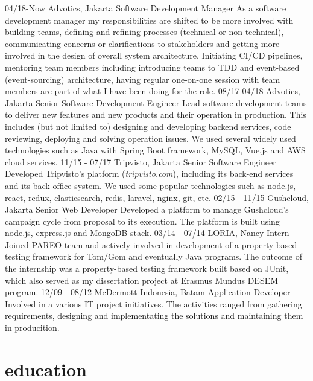 \documentclass[]{friggeri-cv}
\begin{document}
\begin{entrylist}
  \entry
    {04/18-Now}
    {Advotics, Jakarta}
    {Software Development Manager}
    {As a software development manager my responsibilities are shifted to be more involved with building teams,
	defining and refining processes (technical or non-technical), communicating concerns or clarifications to stakeholders
	and getting more involved in the design of overall system architecture. Initiating CI/CD pipelines, mentoring team members
	including introducing teams to TDD and event-based (event-sourcing) architecture,
	having regular one-on-one session with team members are part of what I have been doing for the role.}
  \entry
    {08/17-04/18}
    {Advotics, Jakarta}
    {Senior Software Development Engineer}
    {Lead software development teams to deliver new features and new products and their operation in production.
	This includes (but not limited to) designing and developing backend services, code reviewing, deploying and solving operation issues.
	We used several widely used technologies such as Java with Spring Boot framework, MySQL, Vue.js and AWS cloud services.}
  \entry
    {11/15 - 07/17}
    {Tripvisto, Jakarta}
    {Senior Software Engineer}
	{Developed Tripvisto's platform (\emph{tripvisto.com}), including its back-end services and its back-office system.
	We used some popular technologies such as node.js, react, redux, elasticsearch, redis, laravel, nginx, git, etc.}
  \entry
	{02/15 - 11/15}
	{Gushcloud, Jakarta}
	{Senior Web Developer}
	{Developed a platform to manage Gushcloud's campaign cycle from proposal to its execution. The platform
	is built using node.js, express.js and MongoDB stack.}
  \entry
	{03/14 - 07/14}
	{LORIA, Nancy}
	{Intern}
	{Joined PAREO team and actively involved in development of a property-based testing framework for Tom/Gom
	and eventually Java programs. The outcome of the internship was a property-based testing framework built based
	on JUnit, which also served as my dissertation project at Erasmus Mundus DESEM program.}
  \entry
	{12/09 - 08/12}
	{McDermott Indonesia, Batam}
	{Application Developer}
	{Involved in a various IT project initiatives. The activities ranged from gathering requirements, designing and implementating the solutions
	and maintaining them in producition.}
\end{entrylist}

\section{education}
\end{document}
